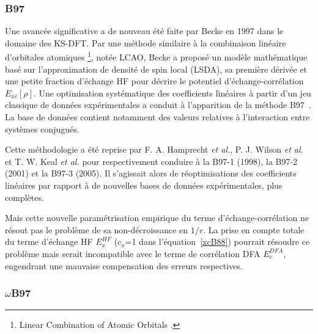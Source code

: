 	
	\subsubsection{B97}
	
	Une avancée significative a de nouveau été faite par Becke en 1997 dans le domaine des KS-DFT. Par une méthode similaire à la combinaison linéaire d'orbitales atomiques \footnote{\og Linear Combination of Atomic Orbitals \fg{}.}, notée LCAO, Becke a proposé un modèle mathématique basé sur l'approximation de densité de spin local (LSDA), sa première dérivée et une petite fraction d'échange HF pour décrire le potentiel d'échange-corrélation $E_{xc}[\rho]$. Une optimisation systématique des coefficients linéaires à partir d'un jeu classique de données expérimentales a conduit à l'apparition de la méthode B97~\cite{becke1997density}. La base de données contient notamment des valeurs relatives à l'interaction entre systèmes conjugués.
	
	Cette méthodologie a été reprise par F. A. Hamprecht \textit{et al.}, P. J. Wilson \textit{et al.} et T. W. Keal \textit{et al.} pour respectivement conduire à la B97-1 \cite{hamprecht1998development} (1998), la B97-2 \cite{wilson2001hybrid} (2001) et la B97-3 \cite{keal2005semiempirical} (2005). Il s'agissait alors de réoptimisations des coefficients linéaires par rapport à de nouvelles bases de données expérimentales, plus complètes.
	
	Mais cette nouvelle paramétrisation empirique du terme d'échange-corrélation ne résout pas le problème de sa non-décroissance en $1/r$. La prise en compte totale du terme d'échange HF $E_{x}^{HF}$ ($c_{x}$=1 dans l'équation~\ref{xcB88}) pourrait résoudre ce problème mais serait incompatible avec le terme de corrélation DFA $E_{c}^{DFA}$, engendrant une mauvaise compensation des erreurs respectives.
	
	\subsubsection{$\omega$B97}
	
